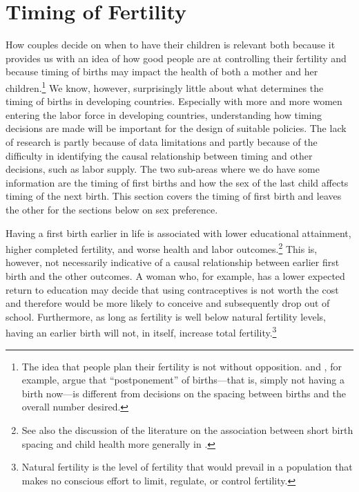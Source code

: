\section{Timing of Fertility}\label{timing-of-fertility}

How couples decide on when to have their children is relevant both because it provides us with an idea of how good people are at controlling their fertility and because timing of births may impact the health of both a mother and her children.\footnote{The idea that people plan their fertility is not without opposition. \citet{Timaeus2008} and \citet{Moultrie2012}, for example, argue that ``postponement'' of births---that is, simply not having a birth now---is different from decisions on the spacing between births and the overall number desired.} We know, however, surprisingly little about what determines the timing of births in developing countries. Especially with more and more women entering the labor force in developing countries, understanding how timing decisions are made will be important for the design of suitable policies. The lack of research is partly because of data limitations and partly because of the difficulty in identifying the causal relationship between timing and other decisions, such as labor supply. The two sub-areas where we do have some information are the timing of first births and how the sex of the last child affects timing of the next birth. This section covers the timing of first birth and leaves the other for the sections below on sex preference.

Having a first birth earlier in life is associated with lower educational attainment, higher completed fertility, and worse health and labor outcomes.\footnote{See also the discussion of the literature on the association between short birth spacing and child health more generally in \citet{Casterline2016}.} This is, however, not necessarily indicative of a causal relationship between earlier first birth and the other outcomes. A woman who, for example, has a lower expected return to education may decide that using contraceptives is not worth the cost and therefore would be more likely to conceive and subsequently drop out of school. Furthermore, as long as fertility is well below natural fertility levels, having an earlier birth will not, in itself, increase total fertility.\footnote{Natural fertility is the level of fertility that would prevail in a population that makes no conscious effort to limit, regulate, or control fertility.}

